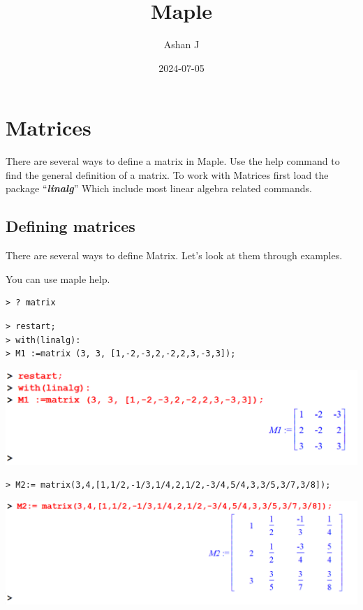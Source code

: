 \documentclass[
]{book}
\title{Maple}
\author{Ashan J}
\date{2024-07-05}
\theoremstyle{definition}
\theoremstyle{definition}
\theoremstyle{definition}
\theoremstyle{definition}
\theoremstyle{remark}
\begin{document}
\maketitle

{
\setcounter{tocdepth}{1}
\tableofcontents
}
\chapter{Matrices}\label{matrices}

There are several ways to define a matrix in Maple.
Use the help command to find the general definition of a matrix.
To work with Matrices first load the package ``\textbf{\emph{linalg}}'' Which include most linear algebra related commands.

\section{Defining matrices}\label{defining-matrices}

There are several ways to define Matrix. Let's look at them through examples.

You can use maple help.

\begin{verbatim}
> ? matrix
\end{verbatim}

\begin{verbatim}
> restart;
> with(linalg):
> M1 :=matrix (3, 3, [1,-2,-3,2,-2,2,3,-3,3]);
\end{verbatim}

\includegraphics{figures/Lesson 4/fig1.png}

\begin{verbatim}
> M2:= matrix(3,4,[1,1/2,-1/3,1/4,2,1/2,-3/4,5/4,3,3/5,3/7,3/8]);
\end{verbatim}

\includegraphics{figures/Lesson 4/fig2.png}
\end{document}

